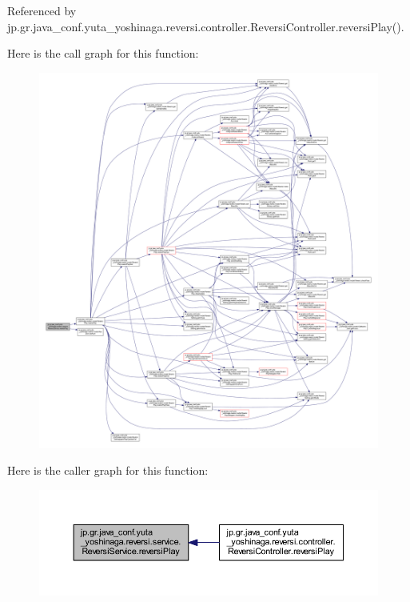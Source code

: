 Referenced by jp.\+gr.\+java\+\_\+conf.\+yuta\+\_\+yoshinaga.\+reversi.\+controller.\+Reversi\+Controller.\+reversi\+Play().

Here is the call graph for this function\+:
\nopagebreak
\begin{figure}[H]
\begin{center}
\leavevmode
\includegraphics[width=350pt]{classjp_1_1gr_1_1java__conf_1_1yuta__yoshinaga_1_1reversi_1_1service_1_1_reversi_service_a63e6f016d6aa03217b96782f0a8adc52_cgraph}
\end{center}
\end{figure}
Here is the caller graph for this function\+:
\nopagebreak
\begin{figure}[H]
\begin{center}
\leavevmode
\includegraphics[width=350pt]{classjp_1_1gr_1_1java__conf_1_1yuta__yoshinaga_1_1reversi_1_1service_1_1_reversi_service_a63e6f016d6aa03217b96782f0a8adc52_icgraph}
\end{center}
\end{figure}
